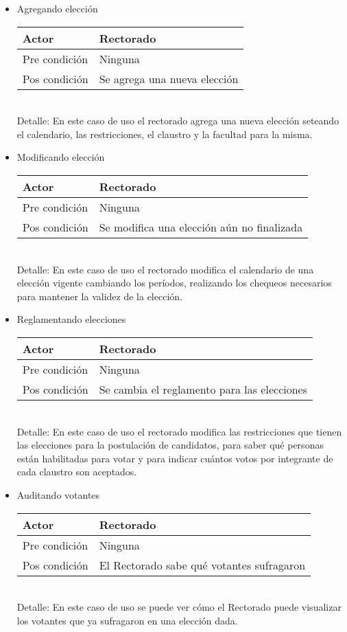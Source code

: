 \begin{itemize}
\bigskip
\item Agregando elección
\begin{center}
\begin{tabular}{ll}
Actor & Rectorado \\
\hline
Pre condici\'on & Ninguna \\
\hline
Pos condici\'on & Se agrega una nueva elección \\
\hline
\end{tabular}
\medskip
\\
Detalle: En este caso de uso el rectorado agrega una nueva elección seteando el calendario, las restricciones, el claustro y la facultad para la misma.
\end{center}


\bigskip
\item Modificando elección
\begin{center}
\begin{tabular}{ll}
Actor & Rectorado \\
\hline
Pre condici\'on & Ninguna \\
\hline
Pos condici\'on & Se modifica una elección aún no finalizada\\
\hline
\end{tabular}
\medskip
\\
Detalle: En este caso de uso el rectorado modifica el calendario de una elección vigente cambiando los períodos, realizando los chequeos necesarios para mantener la validez de la elección.
\end{center}


\bigskip
\item Reglamentando elecciones
\begin{center}
\begin{tabular}{ll}
Actor & Rectorado \\
\hline
Pre condici\'on & Ninguna \\
\hline
Pos condici\'on & Se cambia el reglamento para las elecciones \\
\hline
\end{tabular}
\medskip
\\
Detalle: En este caso de uso el rectorado modifica las restricciones que tienen las elecciones para la postulación de candidatos, para saber qué personas están habilitadas para votar y para indicar cuántos votos por integrante de cada claustro son aceptados.
\end{center}

\bigskip
\item Auditando votantes
\begin{center}
\begin{tabular}{ll}
Actor & Rectorado \\
\hline
Pre condición & Ninguna\\
\hline
Pos condición & El Rectorado sabe qu\'e votantes sufragaron \\
\hline
\end{tabular}
\medskip
\\
Detalle: En este caso de uso se puede ver cómo el Rectorado puede visualizar los votantes que ya sufragaron en una elección dada.
\end{center}  


\end{itemize}
